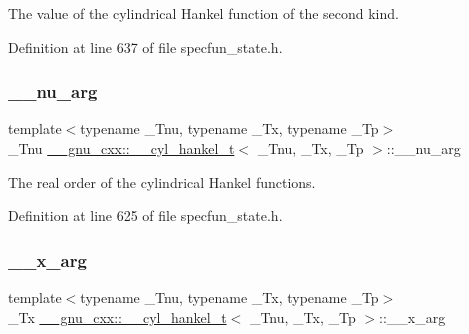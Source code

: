 The value of the cylindrical Hankel function of the second kind. 



Definition at line 637 of file specfun\+\_\+state.\+h.

\mbox{\label{struct____gnu__cxx_1_1____cyl__hankel__t_a67499e047360bcfc7c84f0e3c1d36dab}} 
\subsubsection{\texorpdfstring{\+\_\+\+\_\+nu\+\_\+arg}{\_\_nu\_arg}}
{\footnotesize\ttfamily template$<$typename \+\_\+\+Tnu, typename \+\_\+\+Tx, typename \+\_\+\+Tp$>$ \\
\+\_\+\+Tnu \hyperlink{struct____gnu__cxx_1_1____cyl__hankel__t}{\+\_\+\+\_\+gnu\+\_\+cxx\+::\+\_\+\+\_\+cyl\+\_\+hankel\+\_\+t}$<$ \+\_\+\+Tnu, \+\_\+\+Tx, \+\_\+\+Tp $>$\+::\+\_\+\+\_\+nu\+\_\+arg}



The real order of the cylindrical Hankel functions. 



Definition at line 625 of file specfun\+\_\+state.\+h.

\mbox{\label{struct____gnu__cxx_1_1____cyl__hankel__t_a7b1009ea94ea381fcae13abc9da8b9c6}} 
\subsubsection{\texorpdfstring{\+\_\+\+\_\+x\+\_\+arg}{\_\_x\_arg}}
{\footnotesize\ttfamily template$<$typename \+\_\+\+Tnu, typename \+\_\+\+Tx, typename \+\_\+\+Tp$>$ \\
\+\_\+\+Tx \hyperlink{struct____gnu__cxx_1_1____cyl__hankel__t}{\+\_\+\+\_\+gnu\+\_\+cxx\+::\+\_\+\+\_\+cyl\+\_\+hankel\+\_\+t}$<$ \+\_\+\+Tnu, \+\_\+\+Tx, \+\_\+\+Tp $>$\+::\+\_\+\+\_\+x\+\_\+arg}



